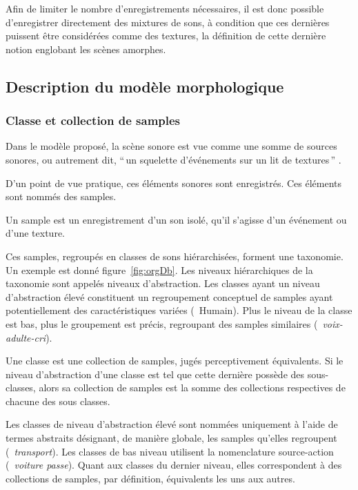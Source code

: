 Afin de limiter le nombre d'enregistrements nécessaires, il est donc possible d'enregistrer directement des mixtures de sons, à condition que ces dernières puissent être considérées comme des textures, la définition de cette dernière notion englobant les scènes amorphes. 

\subsection{Description du modèle morphologique}
\label{sec:ch4_modelDes}

\subsubsection{Classe et collection de samples}
\label{sec:ch4_collecSons}

Dans le modèle proposé, la scène sonore est vue comme une somme de sources sonores, ou autrement dit, ``\,un squelette d'événements sur un lit de textures\,'' \citep{nelken2013ear}. 

D'un point de vue pratique, ces éléments sonores sont enregistrés. Ces éléments sont nommés des samples.
 
\begin{mydef}
Un sample est un enregistrement d'un son isolé, qu'il s'agisse d'un événement ou d'une texture.
\end{mydef}


Ces samples, regroupés en classes de sons hiérarchisées, forment une taxonomie. Un exemple est donné figure~\ref{fig:orgDb}. Les niveaux hiérarchiques de la taxonomie sont appelés niveaux d'abstraction. Les classes ayant un niveau d'abstraction élevé constituent un regroupement conceptuel de samples ayant potentiellement des caractéristiques variées (\eg~{Humain}). Plus le niveau de la classe est bas, plus le groupement est précis, regroupant des samples similaires (\eg~\emph{voix-adulte-cri}). 

\begin{mydef}
Une classe est une collection de samples, jugés perceptivement équivalents. Si le niveau d'abstraction d'une classe est tel que cette dernière possède des sous-classes, alors sa collection de samples est la somme des collections respectives de chacune des sous classes.
\end{mydef}

Les classes de niveau d'abstraction élevé sont nommées uniquement à l'aide de termes abstraits désignant, de manière globale, les samples qu'elles regroupent (\eg~\emph{transport}). Les classes de bas niveau utilisent la nomenclature source-action (\eg~\emph{voiture passe}). Quant aux classes du dernier niveau, elles correspondent à des collections de samples, par définition, équivalents les uns aux autres.

